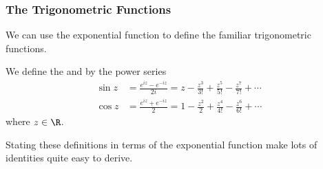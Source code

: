 \documentclass[a4paper]{scrartcl}
\begin{document}


\subsubsection{The Trigonometric Functions}

We can use the exponential function to define the familiar trigonometric functions.

\begin{definition}
	We define the  and  by the power series
	\begin{align*}
		\sin z &= \frac{e^{iz} - e^{-iz}}{2i} = z - \frac{z^3}{3!} + \frac{z^5}{5!} - \frac{z^7}{7!} + \cdots \\
		\cos z &= \frac{e^{iz} + e^{-iz}}{2} = 1 - \frac{z^2}{2} + \frac{z^4}{4!} - \frac{z^6}{6!} + \cdots
	\end{align*}
	where $z \in \R$.
\end{definition}

Stating these definitions in terms of the exponential function make lots of identities quite easy to derive.
\end{document}
